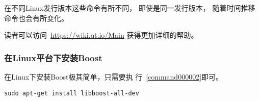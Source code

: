 在不同Linux发行版本这些命令有所不同，
即使是同一发行版本，
随着时间推移命令也会有所变化。

读者可以访问\ \url{https://wiki.qt.io/Main}
获得更加详细的帮助。




\FloatBarrier
\subsubsection{
在Linux平台下安装Boost
}\label{ss000510}



在Linux下安装Boost极其简单，只需要执
行\commandnumbernameone\ \ref{command000002}即可。

\label{command000002}    %
\begin{lstlisting}[caption=GoodLuck,
title=\commandnumbernameone \thecommandnumber
]
sudo apt-get install libboost-all-dev
\end{lstlisting}          %















